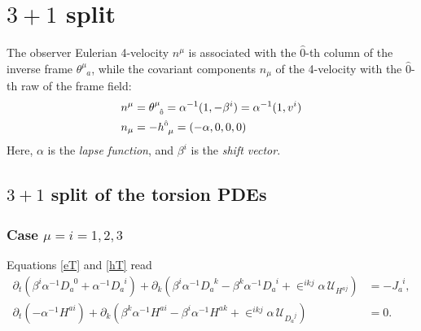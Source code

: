 \documentclass[
10pt, %
a4paper, %
oneside, %
headinclude,footinclude, %
BCOR5mm, %
]{scrartcl}
\newcommand{\IP}[1]{{\color{Red}[IP:\ \ #1]}}
\newcommand{\pd}[1]{\partial_{#1}}
\newcommand{\tetrsymbol}{h}
\newcommand{\itetrsymbol}{\theta}
\newcommand{\itetr}[2]{\itetrsymbol^{#1}_{\phantom{#1}#2}}
\newcommand{\tetr}[2]{\tetrsymbol^{#1}_{\phantom{#1}#2}}
\newcommand{\eT}[2]{D_{#1}^{\phantom{#1}#2}}	%
\newcommand{\hT}[2]{H^{#1#2}}	%
\newcommand{\LagST}{\mathcal{U}}%
\newcommand{\LCsymb}{\bm{\in}}    %
\newcommand{\NC}[2]{J^{\phantom{#1}#2}_{#1}}
\newcommand{\indlat}[1]{\hat{\mathsmaller{#1}}}
\newcommand{\lapse}{\alpha}
\newcommand{\shift}[1]{\beta^{#1}}
\begin{document}


\section{$ 3+1 $ split}	\label{sec.31}

The observer Eulerian 4-velocity $ n^\mu $ is associated with the $ \hat{0} $-th column of the 
inverse frame $ \itetr{\mu}{a} $, while the covariant components $ n_\mu $ of the 4-velocity with 
the $ 
\hat{0} $-th raw of the frame field:
\begin{subequations}
	\begin{align}
		n^{\mu} &= \itetr{\mu}{\indlat{0}}  = \lapse^{-1}(1,-\shift{i}) = \lapse^{-1}(1,v^i)\\
		n_\mu   &= - \tetr{\indlat{0}}{\mu} = (-\lapse,0,0,0) 
	\end{align}
\end{subequations}
Here, $ \lapse $ is the \emph{lapse function}, and $ \shift{i} $ is the \emph{shift vector}.




\subsection{$ 3+1 $ split of the torsion PDEs}	\label{ssec.31.tors}

\subsubsection{Case $ \mu = i=1,2,3 $} 

Equations \eqref{eT} and \eqref{hT} read
\begin{subequations}\label{eqn.tpo.1}
	\begin{align}
		\pd{t} (\shift{i} \lapse^{-1} \eT{a}{0} + \lapse^{-1}\eT{a}{i}) + \pd{k}(\shift{i} 
		\lapse^{-1}\eT{a}{k} - \shift{k}\lapse^{-1}\eT{a}{i}  + \LCsymb^{ikj} \lapse \,
		\LagST_{\hT{a}{j}}) & 
		= -\NC{a}{i}, \\[2mm]
%
		\pd{t} (-\lapse^{-1}\hT{a}{i}) + \pd{k}(\shift{k} 
		\lapse^{-1}\hT{a}{i} - \shift{i}\lapse^{-1}\hT{a}{k}  + \LCsymb^{ikj} \lapse \,
		\LagST_{\eT{a}{j}}) & 
		= 0 .
	\end{align}
\end{subequations}
\end{document}
